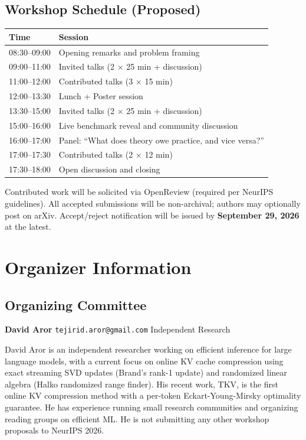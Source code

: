\documentclass{article}
\begin{document}
\subsection*{Workshop Schedule (Proposed)}

\begin{tabular}{ll}
\toprule
Time & Session \\
\midrule
08:30--09:00 & Opening remarks and problem framing \\
09:00--11:00 & Invited talks (2 $\times$ 25 min + discussion) \\
11:00--12:00 & Contributed talks (3 $\times$ 15 min) \\
12:00--13:30 & Lunch + Poster session \\
13:30--15:00 & Invited talks (2 $\times$ 25 min + discussion) \\
15:00--16:00 & Live benchmark reveal and community discussion \\
16:00--17:00 & Panel: ``What does theory owe practice, and vice versa?'' \\
17:00--17:30 & Contributed talks (2 $\times$ 12 min) \\
17:30--18:00 & Open discussion and closing \\
\bottomrule
\end{tabular}

Contributed work will be solicited via OpenReview (required per NeurIPS guidelines).
All accepted submissions will be non-archival; authors may optionally post on arXiv.
Accept/reject notification will be issued by \textbf{September 29, 2026} at the latest.


\newpage
\section*{Organizer Information}

\subsection*{Organizing Committee}

\textbf{David Aror} \quad \texttt{tejirid.aror@gmail.com} \quad Independent Research

David Aror is an independent researcher working on efficient inference for large
language models, with a current focus on online KV cache compression using
exact streaming SVD updates (Brand's rank-1 update) and randomized linear algebra
(Halko randomized range finder).  His recent work, TKV, is the first online KV
compression method with a per-token Eckart-Young-Mirsky optimality guarantee.
He has experience running small research communities and organizing reading groups
on efficient ML.  He is not submitting any other workshop proposals to NeurIPS 2026.
\end{document}
